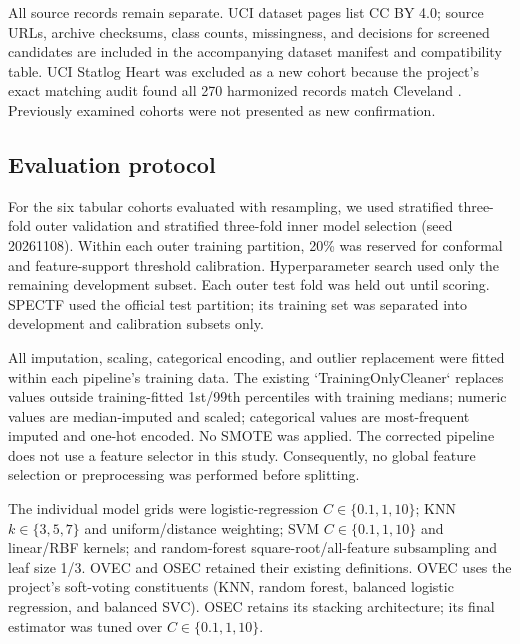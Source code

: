 \documentclass[conference]{IEEEtran}
\begin{document}
All source records remain separate. UCI dataset pages list CC BY 4.0; source URLs, archive checksums, class counts, missingness, and decisions for screened candidates are included in the accompanying dataset manifest and compatibility table. UCI Statlog Heart was excluded as a new cohort because the project’s exact matching audit found all 270 harmonized records match Cleveland \cite{ucistatlog}. Previously examined cohorts were not presented as new confirmation.

\begin{table}[t]
\centering
\caption{Dataset characteristics. CAD cohorts share the UCI angiographic endpoint; heart failure, MI, and SPECTF are different tasks. Class counts are negative/positive.}
\label{tab:datasets}
\scriptsize

\end{table}

\subsection{Evaluation protocol}
For the six tabular cohorts evaluated with resampling, we used stratified three-fold outer validation and stratified three-fold inner model selection (seed 20261108). Within each outer training partition, 20\% was reserved for conformal and feature-support threshold calibration. Hyperparameter search used only the remaining development subset. Each outer test fold was held out until scoring. SPECTF used the official test partition; its training set was separated into development and calibration subsets only.

All imputation, scaling, categorical encoding, and outlier replacement were fitted within each pipeline’s training data. The existing `TrainingOnlyCleaner` replaces values outside training-fitted 1st/99th percentiles with training medians; numeric values are median-imputed and scaled; categorical values are most-frequent imputed and one-hot encoded. No SMOTE was applied. The corrected pipeline does not use a feature selector in this study. Consequently, no global feature selection or preprocessing was performed before splitting.

The individual model grids were logistic-regression $C\in\{0.1,1,10\}$; KNN $k\in\{3,5,7\}$ and uniform/distance weighting; SVM $C\in\{0.1,1,10\}$ and linear/RBF kernels; and random-forest square-root/all-feature subsampling and leaf size 1/3. OVEC and OSEC retained their existing definitions. OVEC uses the project’s soft-voting constituents (KNN, random forest, balanced logistic regression, and balanced SVC). OSEC retains its stacking architecture; its final estimator was tuned over $C\in\{0.1,1,10\}$.
\end{document}
